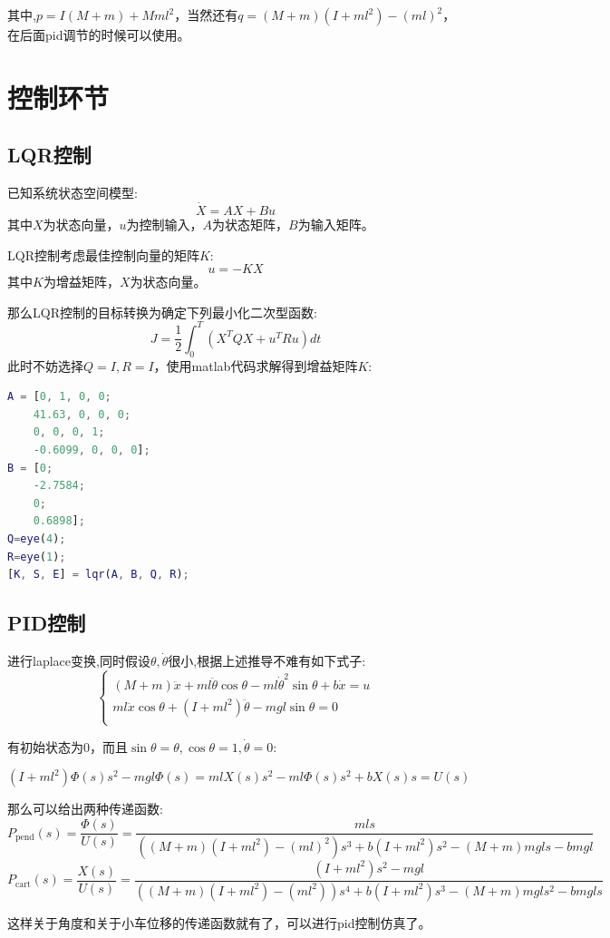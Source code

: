 \documentclass{article}
\begin{document}
其中,$p=I(M+m)+Mml^2$，当然还有$q=(M+m)(I+ml^2)-(ml)^2$，在后面pid调节的时候可以使用。
\section*{控制环节}
\subsection*{LQR控制}
已知系统状态空间模型:
\[
\dot{X}=AX+Bu
\]
其中$X$为状态向量，$u$为控制输入，$A$为状态矩阵，$B$为输入矩阵。

LQR控制考虑最佳控制向量的矩阵$K$:
\[
u=-KX
\]
其中$K$为增益矩阵，$X$为状态向量。

那么LQR控制的目标转换为确定下列最小化二次型函数:
\[
J=\frac{1}{2}\int_{0}^{T}(X^TQX+u^TRu)dt
\]
此时不妨选择$Q=I,R=I$，使用matlab代码求解得到增益矩阵$K$:
\begin{lstlisting}[language=matlab,numbers=none]
A = [0, 1, 0, 0;
    41.63, 0, 0, 0;
    0, 0, 0, 1;
    -0.6099, 0, 0, 0];
B = [0;
    -2.7584;
    0;
    0.6898];
Q=eye(4);
R=eye(1);
[K, S, E] = lqr(A, B, Q, R);
\end{lstlisting}
\subsection*{PID控制}
进行laplace变换,同时假设$\theta,\dot{\theta}$很小,根据上述推导不难有如下式子:
\[\left\{\begin{matrix}
    (M+m)\ddot{x}+ml\ddot{\theta}\cos\theta -ml\dot{\theta}^2\sin\theta + b\dot{x} = u \\
    ml\ddot{x}\cos\theta+(I+ml^2)\ddot{\theta}-mgl\sin\theta = 0 \\
\end{matrix}
\right.\]

有初始状态为0，而且$\sin\theta=\theta,\cos\theta=1,\dot{\theta}=0$:

\[
(I+ml^2)\Phi(s)s^2-mgl\Phi(s)=mlX(s)s^2-ml\Phi(s)s^2+bX(s)s=U(s)
\]

那么可以给出两种传递函数:
\[
P_\text{pend}(s)=\frac{\Phi(s)}{U(s)}=\frac{mls}{((M+m)(I+ml^2)-(ml)^2)s^3+b(I+ml^2)s^2-(M+m)mgls-bmgl}
\]
\[
P_\text{cart}(s)=\frac{X(s)}{U(s)}=\frac{(I+ml^2)s^2-mgl}{((M+m)(I+ml^2)-(ml^2))s^4+b(I+ml^2)s^3-(M+m)mgls^2-bmgls}
\]

这样关于角度和关于小车位移的传递函数就有了，可以进行pid控制仿真了。
\end{document}
